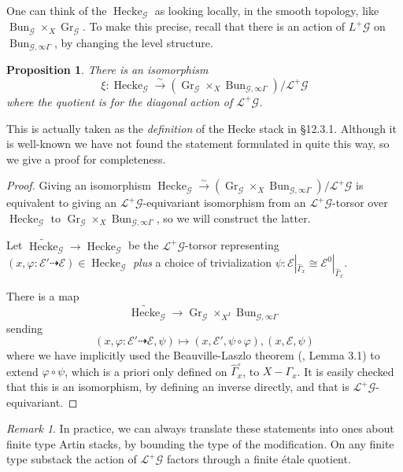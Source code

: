 \documentclass[reqno]{amsart}
\numberwithin{equation}{section}
\newcommand{\wt}[1]{\widetilde{#1}}
\newcommand{\wh}[1]{\widehat{#1}}
\newcommand{\Cal}[1]{\mathcal{#1}}
\newcommand{\co}{\colon}
\DeclareMathOperator{\Bun}{Bun}
\DeclareMathOperator{\Gr}{Gr}
\DeclareMathOperator{\Hecke}{Hecke}
\newtheorem{prop}[thm]{Proposition}
\theoremstyle{remark}
\newtheorem{remark}[thm]{Remark}
\numberwithin{equation}{section}
\begin{document}
One can think of the $\Hecke_{\Cal{G}}$ as looking locally, in the smooth topology, like $\Bun_{\Cal{G}} \times_X \Gr_{\Cal{G}}$. To make this precise, recall that there is an action of $L^+ \Cal{G} $ on $\Bun_{\Cal{G},  \infty \Gamma}$, by changing the level structure. 

 \begin{prop}\label{Hecke to Gr}  There is an isomorphism 
 \[
\xi \colon  \Hecke_{\Cal{G}} \xrightarrow{\sim} (\Gr_{\Cal{G}} \times_{X} \Bun_{\Cal{G}, \infty \Gamma})/\Cal{L}^+ \Cal{G}
 \]
 where the quotient is for the diagonal action of $\Cal{L}^+ \Cal{G}$.
 \end{prop}
 
This is actually taken as the \emph{definition} of the Hecke stack in \cite{Laff12}  \S 12.3.1. Although it is well-known we have not found the statement formulated in quite this way, so we give a proof for completeness. 


\begin{proof}
Giving an isomorphism $\Hecke_{\Cal{G}} \xrightarrow{\sim} (\Gr_{\Cal{G}} \times_X \Bun_{\Cal{G},  \infty \Gamma})/\Cal{L}^+ \Cal{G}$ is equivalent to giving an  $\Cal{L}^+ \Cal{G}$-equivariant isomorphism from an $\Cal{L}^+ \Cal{G}$-torsor over $\Hecke_{\Cal{G}} $ to $\Gr_{\Cal{G}} \times_{X} \Bun_{\Cal{G},  \infty \Gamma}$, so we will construct the latter. 


Let $\wt{\Hecke}_{\Cal{G}}  \rightarrow \Hecke_{\Cal{G}} $ be the $\Cal{L}^+ \Cal{G}$-torsor representing $(x, \varphi \co \Cal{E}' \dashrightarrow \Cal{E}) \in \Hecke_{\Cal{G}}$ \emph{plus} a choice of trivialization $\psi \co \Cal{E}|_{\wh{\Gamma}_x} \cong \Cal{E}^0|_{\wh{\Gamma}_x}$.

There is a map 
\[
\wt{\Hecke}_{\Cal{G}}  \rightarrow \Gr_{\Cal{G}} \times_{X^I} \Bun_{\Cal{G},  \infty \Gamma}
\]
 sending
 \[
 (x, \varphi \co \Cal{E}' \dashrightarrow \Cal{E}, \psi) \mapsto (x,\Cal{E}' , \psi \circ \varphi), (x, \Cal{E}, \psi)
 \]
 where we have implicitly used the Beauville-Laszlo theorem (\cite{Zhu14}, Lemma 3.1) to extend $\varphi \circ \psi$, which is a priori only defined on $\wh{\Gamma}_x^{\circ}$, to $X-\Gamma_x$. It is easily checked that this is an isomorphism, by defining an inverse directly, and that is $\Cal{L}^+ \Cal{G}$-equivariant.

\end{proof}

\begin{remark}In practice, we can always translate these statements into ones about finite type Artin stacks, by bounding the type of the modification. On any finite type substack the action of $\Cal{L}^+ \Cal{G}$ factors through a finite \'{e}tale quotient. 
\end{remark}
\end{document}
